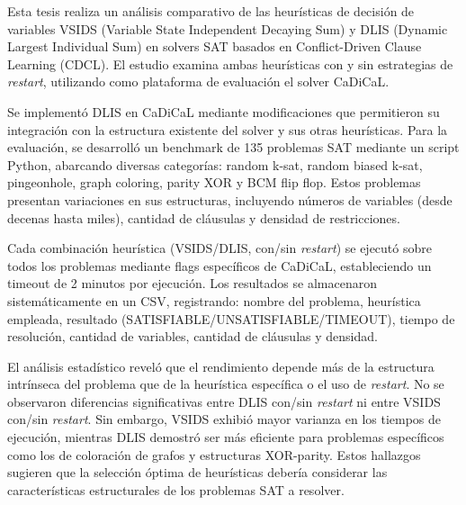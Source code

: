 \begin{resumen}
Esta tesis realiza un an\'alisis comparativo de las heur\'isticas de decisi\'on de variables VSIDS (Variable State Independent Decaying Sum) y DLIS (Dynamic Largest Individual Sum) en solvers SAT basados en Conflict-Driven Clause Learning (CDCL). El estudio examina ambas heur\'isticas con y sin estrategias de \textit{restart}, utilizando como plataforma de evaluaci\'on el solver CaDiCaL. 

Se implement\'o DLIS en CaDiCaL mediante modificaciones que permitieron su integraci\'on con la estructura existente del solver y sus otras heur\'isticas. Para la evaluaci\'on, se desarroll\'o un benchmark de 135 problemas SAT mediante un script Python, abarcando diversas categor\'ias: random k-sat, random biased k-sat, pingeonhole, graph coloring, parity XOR y BCM flip flop. Estos problemas presentan variaciones en sus estructuras, incluyendo n\'umeros de variables (desde decenas hasta miles), cantidad de cl\'ausulas y densidad de restricciones.

Cada combinaci\'on heur\'istica (VSIDS/DLIS, con/sin \textit{restart}) se ejecut\'o sobre todos los problemas mediante flags espec\'ificos de CaDiCaL, estableciendo un timeout de 2 minutos por ejecuci\'on. Los resultados se almacenaron sistem\'aticamente en un CSV, registrando: nombre del problema, heur\'istica empleada, resultado (SATISFIABLE/UNSATISFIABLE/TIMEOUT), tiempo de resoluci\'on, cantidad de variables, cantidad de cl\'ausulas y densidad.

El an\'alisis estad\'istico revel\'o que el rendimiento depende m\'as de la estructura intr\'inseca del problema que de la heur\'istica espec\'ifica o el uso de \textit{restart}. No se observaron diferencias significativas entre DLIS con/sin \textit{restart} ni entre VSIDS con/sin \textit{restart}. Sin embargo, VSIDS exhibi\'o mayor varianza en los tiempos de ejecuci\'on, mientras DLIS demostr\'o ser m\'as eficiente para problemas espec\'ificos como los de coloraci\'on de grafos y estructuras XOR-parity. Estos hallazgos sugieren que la selecci\'on \'optima de heur\'isticas deber\'ia considerar las caracter\'isticas estructurales de los problemas SAT a resolver.
\end{resumen}

